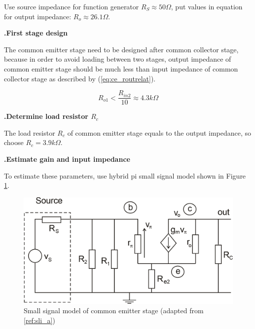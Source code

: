 \documentclass[a4paper,notitlepage,10pt]{report}
\newcommand{\tab}{\hspace{0.75cm}}
\newcommand{\fontHeading}{\fontsize{12pt}{13.2pt}\selectfont}
\newcommand{\fontSubHeading}{\fontsize{10pt}{11pt}\selectfont}
\newcommand{\fontBody}{\fontsize{10pt}{11pt}\selectfont}
\newcounter{sections}
\newcounter{subsections}[sections]
\begin{document}
\begin{multicols}{2}
Use source impedance for function generator $R_S \approx 50\Omega$, put values in equation for output impedance: $R_o \approx 26.1\Omega$.
\parskip=10pt


\fontHeading
{}
\textbf{.\tab First stage design}

\fontBody
The common emitter stage need to be designed after common collector stage, because in order to avoid loading between two stages, output impedance of common emitter stage should be much less than input impedance of common collector stage as described by (\ref{eq:ce_routrelat}).
\parskip=0pt

\begin{equation}
	\label{eq:ce_routrelat}
	R_{o1} < \frac{R_{in2}}{10} \approx 4.3k\Omega
\end{equation}
\parskip=6pt

\fontSubHeading
{}
\textbf{.\tab Determine load resistor $R_c$}

\fontBody
The load resistor $R_c$ of common emitter stage equals to the output impedance, so choose $R_c = 3.9k\Omega$.

\fontSubHeading
{}
\textbf{.\tab Estimate gain and input impedance}

To estimate these parameters, use hybrid pi small signal model shown in Figure \ref{fig:ce_small}.
\parskip=0pt

\begin{figure}[H]
	\centering
	\includegraphics[width=\columnwidth]{ce_small}
	\caption{Small signal model of common emitter stage (adapted from \ref{ref:sli_a})}
	\label{fig:ce_small}
\end{figure}
\parskip=6pt


\end{multicols}
\end{document}
